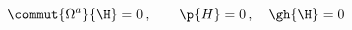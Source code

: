 \begin{equation}
\commut{\Omega^a}{\H}=0\,, \qquad \p{H}=0\,,\quad \gh{\H}=0
\label{eq:Hcond}
\end{equation}

